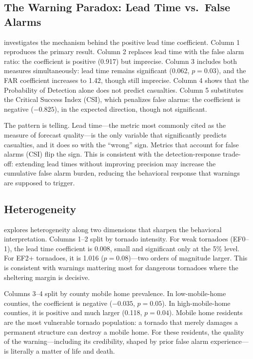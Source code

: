 \documentclass[12pt]{article}
\begin{document}
\subsection{The Warning Paradox: Lead Time vs.\ False Alarms}



 investigates the mechanism behind the positive lead time coefficient. Column 1 reproduces the primary result. Column 2 replaces lead time with the false alarm ratio: the coefficient is positive (0.917) but imprecise. Column 3 includes both measures simultaneously: lead time remains significant (0.062, $p = 0.03$), and the FAR coefficient increases to 1.42, though still imprecise. Column 4 shows that the Probability of Detection alone does not predict casualties. Column 5 substitutes the Critical Success Index (CSI), which penalizes false alarms: the coefficient is negative ($-0.825$), in the expected direction, though not significant.

The pattern is telling. Lead time---the metric most commonly cited as the measure of forecast quality---is the only variable that significantly predicts casualties, and it does so with the ``wrong'' sign. Metrics that account for false alarms (CSI) flip the sign. This is consistent with the detection-response trade-off: extending lead times without improving precision may increase the cumulative false alarm burden, reducing the behavioral response that warnings are supposed to trigger.

\subsection{Heterogeneity}



 explores heterogeneity along two dimensions that sharpen the behavioral interpretation. Columns 1--2 split by tornado intensity. For weak tornadoes (EF0--1), the lead time coefficient is 0.008, small and significant only at the 5\% level. For EF2+ tornadoes, it is 1.016 ($p = 0.08$)---two orders of magnitude larger. This is consistent with warnings mattering most for dangerous tornadoes where the sheltering margin is decisive.

Columns 3--4 split by county mobile home prevalence. In low-mobile-home counties, the coefficient is negative ($-0.035$, $p = 0.05$). In high-mobile-home counties, it is positive and much larger (0.118, $p = 0.04$). Mobile home residents are the most vulnerable tornado population: a tornado that merely damages a permanent structure can destroy a mobile home. For these residents, the quality of the warning---including its credibility, shaped by prior false alarm experience---is literally a matter of life and death.
\end{document}
